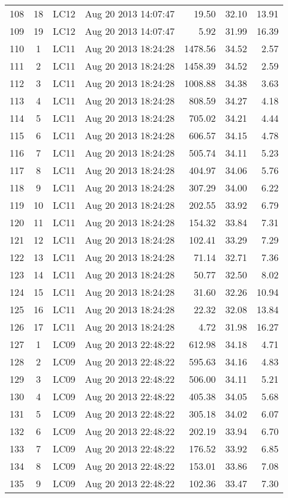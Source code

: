 \begin{longtable}{ccllrrr}
108&18&LC12&Aug 20 2013 14:07:47&19.50&32.10&13.91\\
109&19&LC12&Aug 20 2013 14:07:47&5.92&31.99&16.39\\
\hline 
110&1&LC11&Aug 20 2013 18:24:28&1478.56&34.52&2.57\\
111&2&LC11&Aug 20 2013 18:24:28&1458.39&34.52&2.59\\
112&3&LC11&Aug 20 2013 18:24:28&1008.88&34.38&3.63\\
113&4&LC11&Aug 20 2013 18:24:28&808.59&34.27&4.18\\
114&5&LC11&Aug 20 2013 18:24:28&705.02&34.21&4.44\\
115&6&LC11&Aug 20 2013 18:24:28&606.57&34.15&4.78\\
116&7&LC11&Aug 20 2013 18:24:28&505.74&34.11&5.23\\
117&8&LC11&Aug 20 2013 18:24:28&404.97&34.06&5.76\\
118&9&LC11&Aug 20 2013 18:24:28&307.29&34.00&6.22\\
119&10&LC11&Aug 20 2013 18:24:28&202.55&33.92&6.79\\
120&11&LC11&Aug 20 2013 18:24:28&154.32&33.84&7.31\\
121&12&LC11&Aug 20 2013 18:24:28&102.41&33.29&7.29\\
122&13&LC11&Aug 20 2013 18:24:28&71.14&32.71&7.36\\
123&14&LC11&Aug 20 2013 18:24:28&50.77&32.50&8.02\\
124&15&LC11&Aug 20 2013 18:24:28&31.60&32.26&10.94\\
125&16&LC11&Aug 20 2013 18:24:28&22.32&32.08&13.84\\
126&17&LC11&Aug 20 2013 18:24:28&4.72&31.98&16.27\\
\hline 
127&1&LC09&Aug 20 2013 22:48:22&612.98&34.18&4.71\\
128&2&LC09&Aug 20 2013 22:48:22&595.63&34.16&4.83\\
129&3&LC09&Aug 20 2013 22:48:22&506.00&34.11&5.21\\
130&4&LC09&Aug 20 2013 22:48:22&405.38&34.05&5.68\\
131&5&LC09&Aug 20 2013 22:48:22&305.18&34.02&6.07\\
132&6&LC09&Aug 20 2013 22:48:22&202.19&33.94&6.70\\
133&7&LC09&Aug 20 2013 22:48:22&176.52&33.92&6.85\\
134&8&LC09&Aug 20 2013 22:48:22&153.01&33.86&7.08\\
135&9&LC09&Aug 20 2013 22:48:22&102.36&33.47&7.30\\

\end{longtable}
